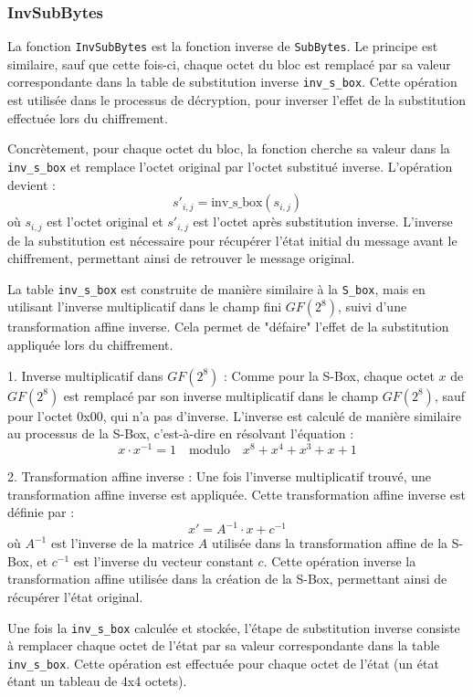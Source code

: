 \documentclass[a4paper, 10pt]{article}
\begin{document}
\subsubsection{InvSubBytes}
La fonction \texttt{InvSubBytes} est  la fonction inverse de \texttt{SubBytes}. Le principe est similaire, sauf que cette fois-ci, chaque octet du bloc est remplacé par sa valeur correspondante dans la table de substitution inverse \texttt{inv\_s\_box}. Cette opération est utilisée dans le processus de décryption, pour inverser l’effet de la substitution effectuée lors du chiffrement.

Concrètement, pour chaque octet du bloc, la fonction cherche sa valeur dans la \texttt{inv\_s\_box} et remplace l'octet original par l'octet substitué inverse. L’opération devient :
\[
  s'_{i,j} = \text{inv\_s\_box}(s_{i,j})
\]
où \( s_{i,j} \) est l'octet original et \( s'_{i,j} \) est l'octet après substitution inverse. L'inverse de la substitution est nécessaire pour récupérer l'état initial du message avant le chiffrement, permettant ainsi de retrouver le message original.

La table \texttt{inv\_s\_box} est construite de manière similaire à la \texttt{S\_box}, mais en utilisant l'inverse multiplicatif dans le champ fini \( GF(2^8) \), suivi d'une transformation affine inverse. Cela permet de "défaire" l'effet de la substitution appliquée lors du chiffrement.

1. Inverse multiplicatif dans \( GF(2^8) \) : Comme pour la S-Box, chaque octet \( x \) de \( GF(2^8) \) est remplacé par son inverse multiplicatif dans le champ \( GF(2^8) \), sauf pour l'octet 0x00, qui n'a pas d'inverse. L'inverse est calculé de manière similaire au processus de la S-Box, c'est-à-dire en résolvant l'équation :
   \[
   x \cdot x^{-1} = 1 \quad \text{modulo} \quad x^8 + x^4 + x^3 + x + 1
   \]
   
2. Transformation affine inverse : Une fois l'inverse multiplicatif trouvé, une transformation affine inverse est appliquée. Cette transformation affine inverse est définie par :
   \[
   x' = A^{-1} \cdot x + c^{-1}
   \]
   où \( A^{-1} \) est l'inverse de la matrice \( A \) utilisée dans la transformation affine de la S-Box, et \( c^{-1} \) est l'inverse du vecteur constant \( c \). Cette opération inverse la transformation affine utilisée dans la création de la S-Box, permettant ainsi de récupérer l'état original.

Une fois la \texttt{inv\_s\_box} calculée et stockée, l'étape de substitution inverse consiste à remplacer chaque octet de l'état par sa valeur correspondante dans la table \texttt{inv\_s\_box}. Cette opération est effectuée pour chaque octet de l'état (un état étant un tableau de 4x4 octets).
\end{document}
